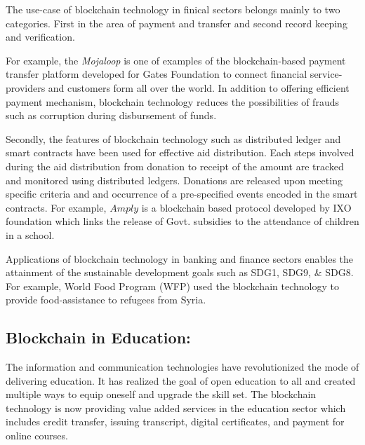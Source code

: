 \documentclass[10pt]{IETBook}
\begin{document}
The use-case of blockchain technology in finical sectors belongs mainly to two categories. First in the area of payment and transfer and second record keeping and verification.

For example, the \textit{Mojaloop} is one of examples of the blockchain-based payment transfer platform developed for  Gates Foundation to connect financial service-providers and customers form all over the world. In addition to offering efficient payment mechanism,  blockchain technology  reduces the possibilities of  frauds such as corruption during disbursement of funds.  

Secondly, the features of blockchain technology such as distributed ledger and smart contracts have been used for effective aid distribution. Each steps involved during the aid distribution from donation to receipt of the amount are tracked and monitored using distributed ledgers. Donations are released upon meeting specific criteria and and occurrence of a pre-specified events encoded in the smart contracts. For example, $Amply$ \cite{bi} is a blockchain based protocol developed by IXO foundation which links  the release of Govt. subsidies to the attendance of children in a school.




Applications of blockchain technology in banking and finance sectors enables the attainment of  the  sustainable development goals  such as SDG1, SDG9, \& SDG8. For example,  World Food Program (WFP) used the blockchain technology to provide food-assistance to refugees from Syria.  
		
\subsection{Blockchain in Education:}

The information and communication technologies have revolutionized the
mode of delivering education. It has realized the goal of open education to all and created multiple ways to equip oneself and upgrade the skill set.
The blockchain technology is now providing  value added services in the education sector which includes credit transfer, issuing  transcript, digital certificates,  and payment for online courses. 
\end{document}
